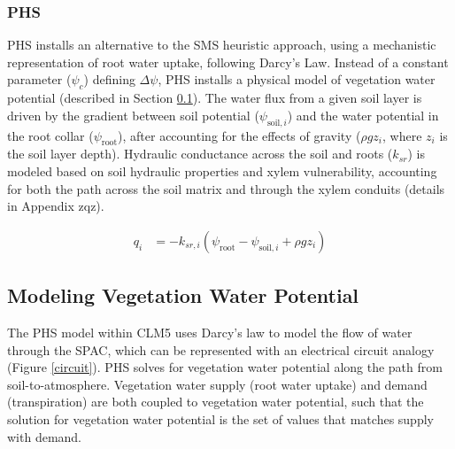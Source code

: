 \documentclass[draft,linenumbers]{agujournal}
\begin{document}
    
    \subsubsection{PHS}
    
    PHS installs an alternative to the SMS heuristic approach, using a mechanistic representation of root water uptake, following Darcy's Law.
    Instead of a constant parameter ($\psi_c$) defining $\Delta\psi$, PHS installs a physical model of vegetation water potential (described in Section \ref{sect:vwp}).
    The water flux from a given soil layer is driven by the gradient between soil potential ($\psi_{\text{soil},i}$) and the water potential in the root collar ($\psi_{\text{root}}$), 
    after accounting for the effects of gravity ($\rho g z_i$, where $z_i$ is the soil layer depth).
    Hydraulic conductance across the soil and roots ($k_{sr}$) is modeled based on soil hydraulic properties and xylem vulnerability, 
    accounting for both the path across the soil matrix and through the xylem conduits (details in Appendix zqz).
    
    \begin{linenomath*}
    \begin{equation}
        \begin{aligned}
    q_i &= -k_{sr,i}  \left(\psi_{\text{root}}-\psi_{\text{soil},i}+\rho g z_i\right)
    \label{phs:sink}
    \end{aligned}
    \end{equation}
    \end{linenomath*}
    
\subsection{Modeling Vegetation Water Potential}
\label{sect:vwp}
  The PHS model within CLM5 uses Darcy's law to model the flow of water through the SPAC, which can be represented with an electrical circuit analogy (Figure \ref{circuit}).
  PHS solves for vegetation water potential along the path from soil-to-atmosphere.
  Vegetation water supply (root water uptake) and demand (transpiration) are both coupled to vegetation water potential, 
  such that the solution for vegetation water potential is the set of values that matches supply with demand.
\end{document}
